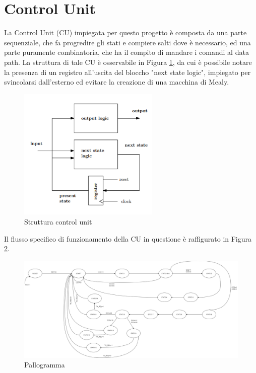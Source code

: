 \documentclass[a4paper, titlepage]{article}
\begin{document}
\section{Control Unit}
La Control Unit (CU) impiegata per questo progetto è composta da una parte sequenziale, che fa progredire gli stati e compiere salti dove è necessario, ed una parte puramente combinatoria, che ha il compito di mandare i comandi al data path. La struttura di tale CU è osservabile in Figura \ref{fig:CU_struttura}, da cui è possibile notare la presenza di un registro all'uscita del bloccho "next state logic", impiegato per svincolarsi dall'esterno ed evitare la creazione di una macchina di Mealy. 
\begin{figure}[H]
    \centering
    \includegraphics[width=0.6\textwidth]{CU_struttura.png}
    \caption{Struttura control unit}
    \label{fig:CU_struttura}
\end{figure}
\noindent Il flusso specifico di funzionamento della CU in questione è raffigurato in Figura \ref{fig:pallogramma}.
\begin{figure}[H]
\includegraphics[width=1\textwidth]{Palleogramma_micV2.png}
    \caption{Pallogramma}
    \label{fig:pallogramma}
\end{figure}
\end{document}
